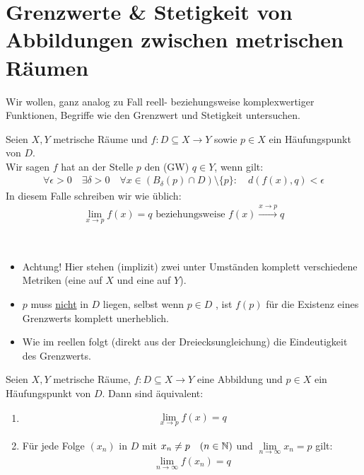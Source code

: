 \cleardoublepage
\section{Grenzwerte \& Stetigkeit von Abbildungen zwischen metrischen Räumen}

Wir wollen, ganz analog zu Fall reell- beziehungsweise komplexwertiger Funktionen, 
Begriffe wie den Grenzwert und Stetigkeit untersuchen.

\begin{Definition}{%
	Seien $X,Y$ metrische Räume und $f: D \subseteq X \rightarrow Y$ sowie $p \in 
	X$ ein Häufungspunkt von $D$.\\
	Wir sagen $f$ hat an der Stelle $p$ den  (GW) $q \in Y$, wenn 
	gilt:
	\begin{align*}
		\forall \epsilon > 0 \quad \exists \delta > 0  \quad \forall x 
		\in (B_\delta(p) \cap D) \setminus \{p\}: \quad d(f(x), q) < \epsilon
	\end{align*}
	In diesem Falle schreiben wir wie üblich:
	\begin{align*}
		\lim\limits_{x \rightarrow p}{f(x)} = q \text{ beziehungsweise } 
		f(x) \xrightarrow{x \rightarrow p}q
	\end{align*}
}\end{Definition}

\begin{Bemerkung}{
	~\begin{itemize}
		\item Achtung! Hier stehen (implizit) zwei unter Umständen komplett 
		verschiedene Metriken (eine auf $X$ und eine auf $Y$).
		\item $p$ muss \underline{nicht} in $D$ liegen, selbst wenn $p \in D$ , ist 
		$f(p)$ für die Existenz eines Grenzwerts komplett unerheblich.
		\item Wie im reellen folgt (direkt aus der Dreiecksungleichung) die 
		Eindeutigkeit des Grenzwerts.
	\end{itemize}
}\end{Bemerkung}

\begin{Satz}{%
	Seien $X,Y$ metrische Räume, $f: D \subseteq X \rightarrow Y$ eine Abbildung 
	und $p \in X$ ein Häufungspunkt von $D$. Dann sind äquivalent:
	\begin{enumerate}
		\item \label{vl_24_stp_1} \begin{align*}
				\lim\limits_{x \rightarrow p}{f(x)} = q
			\end{align*}
		\item \label{vl_24_stp_2} Für jede Folge $(x_n)$ in $D$ mit $x_n \neq p 
		\quad (n \in \mathbb{N})$ und $\lim\limits_{n \rightarrow \infty}{x_n}=p$ gilt:
			\begin{align*}
				\lim\limits_{n \rightarrow \infty}{f(x_n)} = q
			\end{align*}
	\end{enumerate}
}\end{Satz}

